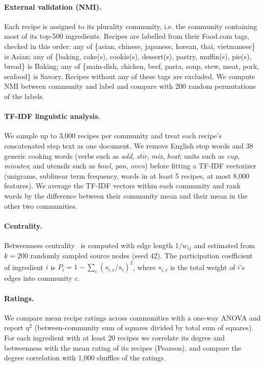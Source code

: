 \documentclass[9pt,twocolumn]{pnas-new}
\begin{document}
\paragraph{External validation (NMI).}
Each recipe is assigned to its plurality community, i.e. the community containing most of its top-500 ingredients. Recipes are labelled from their Food.com tags, checked in this order: any of \{asian, chinese, japanese, korean, thai, vietnamese\} is Asian; any of \{baking, cake(s), cookie(s), dessert(s), pastry, muffin(s), pie(s), bread\} is Baking; any of \{main-dish, chicken, beef, pasta, soup, stew, meat, pork, seafood\} is Savory. Recipes without any of these tags are excluded. We compute NMI between community and label and compare with 200 random permutations of the labels.

\paragraph{TF-IDF linguistic analysis.}
We sample up to 3,000 recipes per community and treat each recipe's concatenated step text as one document. We remove English stop words and 38 generic cooking words (verbs such as \textit{add}, \textit{stir}, \textit{mix}, \textit{heat}; units such as \textit{cup}, \textit{minutes}; and utensils such as \textit{bowl}, \textit{pan}, \textit{oven}) before fitting a TF-IDF vectorizer (unigrams, sublinear term frequency, words in at least 5 recipes, at most 8,000 features). We average the TF-IDF vectors within each community and rank words by the difference between their community mean and their mean in the other two communities.

\paragraph{Centrality.}
Betweenness centrality~\cite{brandes2001faster} is computed with edge length $1/w_{ij}$ and estimated from $k = 200$ randomly sampled source nodes (seed 42). The participation coefficient~\cite{guimera2005functional} of ingredient $i$ is $P_i = 1 - \sum_c (s_{i,c}/s_i)^2$, where $s_{i,c}$ is the total weight of $i$'s edges into community $c$.

\paragraph{Ratings.}
We compare mean recipe ratings across communities with a one-way ANOVA and report $\eta^2$ (between-community sum of squares divided by total sum of squares). For each ingredient with at least 20 recipes we correlate its degree and betweenness with the mean rating of its recipes (Pearson), and compare the degree correlation with 1,000 shuffles of the ratings.
\end{document}
